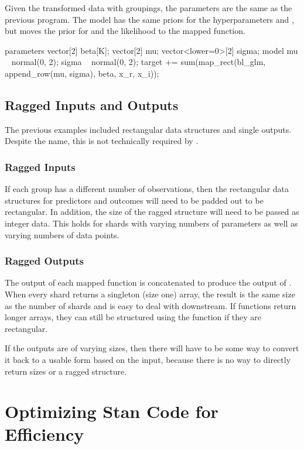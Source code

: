 Given the transformed data with groupings, the parameters are the same
as the previous program.  The model has the same priors for the
hyperparameters  and , but moves the prior for
 and the likelihood to the mapped function.
%
\begin{stancode}
parameters {
  vector[2] beta[K];
  vector[2] mu;
  vector<lower=0>[2] sigma;
}
model {
  mu ~ normal(0, 2);
  sigma ~ normal(0, 2);
  target += sum(map_rect(bl_glm, append_row(mu, sigma), beta, x_r, x_i));
}
\end{stancode}
%

\section{Ragged Inputs and Outputs}

The previous examples included rectangular data structures and single
outputs.  Despite the name, this is not technically required by
.

\subsection{Ragged Inputs}

If each group has a different number of observations, then the
rectangular data structures for predictors and outcomes will need to
be padded out to be rectangular.  In addition, the size of the ragged
structure will need to be passed as integer data. This holds for
shards with varying numbers of parameters as well as varying numbers
of data points.

\subsection{Ragged Outputs}

The output of each mapped function is concatenated to produce the
output of .  When every shard returns a singleton
(size one) array, the result is the same size as the number of shards
and is easy to deal with downstream.  If functions return longer
arrays, they can still be structured using the 
function if they are rectangular.

If the outputs are of varying sizes, then there will have to be some way
to convert it back to a usable form based on the input, because there
is no way to directly return sizes or a ragged structure.


\chapter{Optimizing Stan Code for Efficiency}\label{optimization.chapter}

